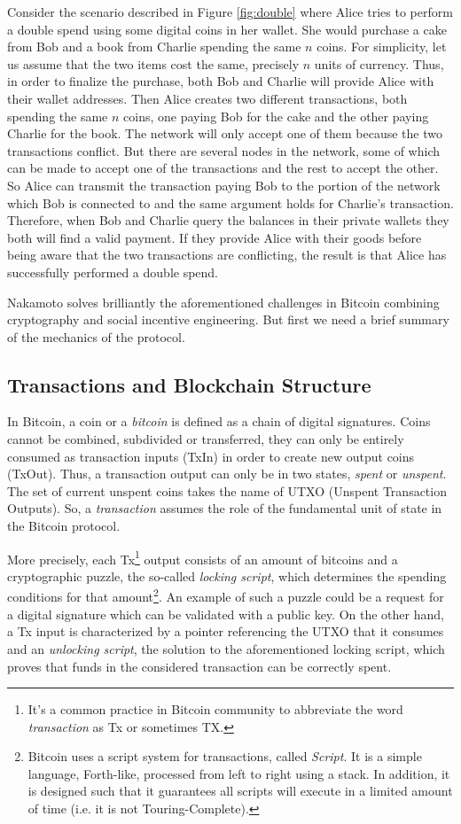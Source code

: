 \bigskip
\noindent
Consider the scenario described in Figure \ref{fig:double} where Alice tries to perform a double spend using some digital coins in her wallet. She would purchase a cake from Bob and a book from Charlie spending the same $n$ coins. For simplicity, let us assume that the two items cost the same, precisely $n$ units of currency. Thus, in order to finalize the purchase, both Bob and Charlie will provide Alice with their wallet addresses. Then Alice creates two different transactions, both spending the same $n$ coins, one paying Bob for the cake and the other paying Charlie for the book. The network will only accept one of them because the two transactions conflict. But there are several nodes in the network, some of which can be made to accept one of the transactions and the rest to accept the other. So Alice can transmit the transaction paying Bob to the portion of the network which Bob is connected to and the same argument holds for Charlie's transaction. Therefore, when Bob and Charlie query the balances in their private wallets they both will find a valid payment. If they provide Alice with their goods before being aware that the two transactions are conflicting, the result is that Alice has successfully performed a double spend.

\bigskip
\noindent
Nakamoto solves brilliantly the aforementioned challenges in Bitcoin combining cryptography and social incentive engineering. But first we need a brief summary of the mechanics of the protocol.

\bigskip
\subsection{Transactions and Blockchain Structure}
In Bitcoin, a coin or a \textit{bitcoin} is defined as a chain of digital signatures. Coins cannot be combined, subdivided or transferred, they can only be entirely consumed as transaction inputs (TxIn) in order to create new output coins (TxOut). Thus, a transaction output can only be in two states, \textit{spent} or \textit{unspent}. The set of current unspent coins takes the name of UTXO (Unspent Transaction Outputs). So, a \textit{transaction} assumes the role of the fundamental unit of state in the Bitcoin protocol.

\bigskip
\noindent
More precisely, each Tx\footnote{It's a common practice in Bitcoin community to abbreviate the word \textit{transaction} as Tx or sometimes TX.} output consists of an amount of bitcoins and a cryptographic puzzle, the so-called \textit{locking script}, which determines the spending conditions for that amount\footnote{Bitcoin uses a script system for transactions, called \textit{Script}. It is a simple language, Forth-like, processed from left to right using a stack. In addition, it is designed such that it guarantees all scripts will execute in a limited amount of time (i.e. it is not Touring-Complete).}. An example of such a puzzle could be a request for a digital signature which can be validated with a public key. On the other hand, a Tx input is characterized by a pointer referencing the UTXO that it consumes and an \textit{unlocking script}, the solution to the aforementioned locking script, which proves that funds in the considered transaction can be correctly spent.

